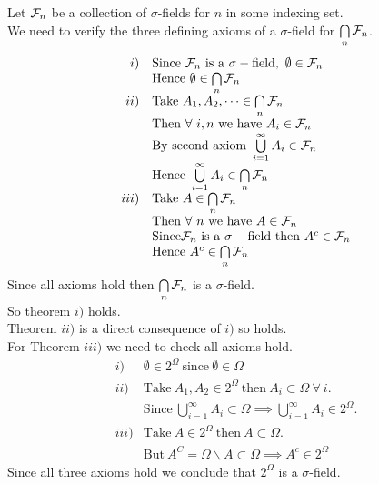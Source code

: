 \documentclass[11pt,a4paper]{article}
\begin{document}
Let $\mathcal{F}_n$ be a collection of $\sigma$-fields for $n$  in some indexing set.\\
We need to verify the three defining axioms of a $\sigma$-field for $\bigcap\limits_n\mathcal{F}_n$.
\[\begin{array}{rl}
i)&\mathrm{Since}\ \sigmafield_n\ \mathrm{is\ a}\ \sigma-\mathrm{field},\ \emptyset\in\sigmafield_n\\
&\mathrm{Hence}\ \emptyset\in\bigcap\limits_n\sigmafield_n\\
ii)&\mathrm{Take}\ A_1,A_2,\dots\in\bigcap\limits_n\sigmafield_n\\
&\mathrm{Then}\ \forall\ i,n\ \mathrm{we\ have}\ A_i\in\sigmafield_n\\
&\mathrm{By\ second\ axiom}\ \bigcup\limits_{i=1}^{\infty}A_i\in\sigmafield_n\\
&\mathrm{Hence}\ \bigcup\limits_{i=1}^{\infty}A_i\in\bigcap\limits_n\sigmafield_n\\
iii)&\mathrm{Take}\ A\in\bigcap\limits_n\sigmafield_n\\
&\mathrm{Then}\ \forall\ n\ \mathrm{we\ have\ } A\in\sigmafield_n\\
&\mathrm{Since} \sigmafield_n\ \mathrm{is\ a\ }\sigma-\mathrm{field\ then\ } A^c\in\sigmafield_n\\
&\mathrm{Hence\ }A^c\in\bigcap\limits_n\sigmafield_n
\end{array}\]
Since all axioms hold then $\bigcap\limits_n\mathcal{F}_n$ is a $\sigma$-field.\\
So theorem $i)$ holds.\\
Theorem $ii)$ is a direct consequence of $i)$ so holds.\\
For Theorem $iii)$ we need to check all axioms hold.\\
\[\begin{array}{rl}
i)&\emptyset\in2^\Omega\ \mathrm{since}\ \emptyset\in\Omega\\
ii)& \mathrm{Take}\ A_1,A_2\in2^\Omega\ \mathrm{then}\ A_i\subset\Omega\ \forall\ i.\\
&\mathrm{Since}\ \bigcup\limits_{i=1}^\infty A_i\subset\Omega\implies\bigcup\limits_{i=1}^\infty A_i\in2^\Omega.\\
iii)&\mathrm{Take}\ A\in2^\Omega\ \mathrm{then}\ A\subset\Omega.\\
&\mathrm{But}\ A^C=\Omega\backslash A\subset\Omega\implies A^c\in2^\Omega
\end{array}\]
Since all three axioms hold we conclude that $2^\Omega$ is a $\sigma$-field.\\
\end{document}
